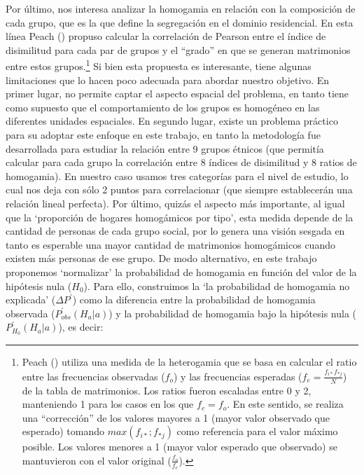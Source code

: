 \documentclass[
  spanish,
  a4paper,%
  chapterprefix=true,%
  DIV=calc,%
  twoside]{scrbook}%
\begin{document}
Por último, nos interesa analizar la homogamia en relación con la
composición de cada grupo, que es la que define la segregación en el
dominio residencial. En esta línea Peach () propuso calcular la
correlación de Pearson entre el índice de disimilitud para cada par de
grupos y el ``grado'' en que se generan matrimonios entre estos
grupos.\footnote{Peach () utiliza una medida de la
  heterogamia que se basa en calcular el ratio entre las frecuencias
  observadas (\(f_o\)) y las frecuencias esperadas
  (\(f_e = \frac{f_{i*}f_{*j}}{N}\)) de la tabla de matrimonios. Los
  ratios fueron escaladas entre 0 y 2, manteniendo 1 para los casos en
  los que \(f_e=f_o\). En este sentido, se realiza una ``corrección'' de
  los valores mayores a 1 (mayor valor observado que esperado) tomando
  \(max(f_{i*};f_{*j})\) como referencia para el valor máximo posible.
  Los valores menores a 1 (mayor valor esperado que observado) se
  mantuvieron con el valor original (\(\frac{f_o}{f_e}\)).} Si bien esta propuesta es
interesante, tiene algunas limitaciones que lo hacen poco adecuada para
abordar nuestro objetivo. En primer lugar, no permite captar el aspecto
espacial del problema, en tanto tiene como supuesto que el
comportamiento de los grupos es homogéneo en las diferentes unidades
espaciales. En segundo lugar, existe un problema práctico para su
adoptar este enfoque en este trabajo, en tanto la metodología fue
desarrollada para estudiar la relación entre 9 grupos étnicos (que
permitía calcular para cada grupo la correlación entre 8 índices de
disimilitud y 8 ratios de homogamia). En nuestro caso usamos tres
categorías para el nivel de estudio, lo cual nos deja con sólo 2 puntos
para correlacionar (que siempre establecerán una relación lineal
perfecta). Por último, quizás el aspecto más importante, al igual que la
`proporción de hogares homogámicos por tipo', esta medida depende de la
cantidad de personas de cada grupo social, por lo genera una visión
sesgada en tanto es esperable una mayor cantidad de matrimonios
homogámicos cuando existen más personas de ese grupo. De modo
alternativo, en este trabajo proponemos `normalizar' la probabilidad de
homogamia en función del valor de la hipótesis nula (\(H_0\)). Para ello,
construimos la `la probabilidad de homogamia no explicada'
(\(\Delta P^{\prime}\)) como la diferencia entre la probabilidad de
homogamia observada (\(P_{obs}^{\prime}(H_a|a)\)) y la probabilidad de
homogamia bajo la hipótesis nula (\(P_{H_0}^{\prime}(H_a|a)\)), es decir:
\end{document}
